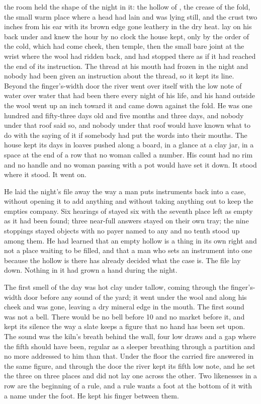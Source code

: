 
 the room held the shape of the night in it: the hollow of , the crease of the fold, the small warm place where a head had lain and was lying still, and the crust two inches from his ear with its brown edge gone leathery in the dry heat.  lay on his back under  and knew the hour by no clock the house kept, only by the order of the cold, which had come cheek, then temple, then the small bare joint at the wrist where the wool had ridden back, and had stopped there as if it had reached the end of its instruction. The thread at his mouth had frozen in the night and nobody had been given an instruction about the thread, so it kept its line. Beyond the finger's-width door the river went over itself with the low note of water over water that had been there every night of his life, and his hand outside the wool went up an inch toward it and came down against the fold. He was one hundred and fifty-three days old and five months and three days, and nobody under that roof said so, and nobody under that roof would have known what to do with the saying of it if somebody had put the words into their mouths. The house kept its days in loaves pushed along a board, in a glance at a clay jar, in a space at the end of a row that no woman called a number. His count had no rim and no handle and no woman passing with a pot would have set it down. It stood where it stood. It went on.

He laid the night's file away the way a man puts instruments back into a case, without opening it to add anything and without taking anything out to keep the empties company. Six hearings of  stayed six with the seventh place left as empty as it had been found; three near-full answers stayed on their own tray; the nine stoppings stayed objects with no payer named to any and no tenth stood up among them. He had learned that an empty hollow is a thing in its own right and not a place waiting to be filled, and that a man who sets an instrument into one because the hollow is there has already decided what the case is. The file lay down. Nothing in it had grown a hand during the night.

The first smell of the day was hot clay under tallow, coming through the finger's-width door before any sound of the yard; it went under the wool and along his cheek and was gone, leaving a dry mineral edge in the mouth. The first sound was not a bell. There would be no bell before  10 and no market before it, and  kept its silence the way a slate keeps a figure that no hand has been set upon. The sound was the kiln's breath behind the wall, four low draws and a gap where the fifth should have been, regular as a sleeper breathing through a partition and no more addressed to him than that. Under the floor the carried fire answered in the same figure, and through the door the river kept its fifth low note, and he set the three on three places and did not lay one across the other. Two likenesses in a row are the beginning of a rule, and a rule wants a foot at the bottom of it with a name under the foot. He kept his finger between them.

